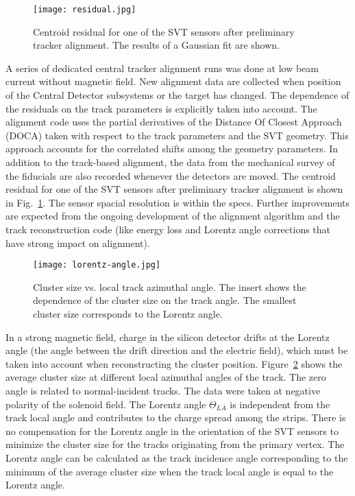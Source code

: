 \begin{figure}[hbt] 
\centering 
\texttt{[image: residual.jpg]}
\caption{Centroid residual for one of the SVT sensors after preliminary tracker alignment. The results of a Gaussian fit are shown.}
\label{fig:residual}
\end{figure}

A series of dedicated central tracker alignment runs was done at low beam current without magnetic field. New alignment data are collected when position of the Central Detector subsystems or the target has changed. The dependence of the residuals on the track parameters is explicitly taken into account. The alignment code uses the partial derivatives of the Distance Of Closest Approach (DOCA) taken with respect to the track parameters and the SVT geometry. This approach accounts for the correlated shifts among the geometry parameters. In addition to the track-based alignment, the data from the mechanical survey of the fiducials are also recorded whenever the detectors are moved. The centroid residual for one of the SVT sensors after preliminary tracker alignment is shown in Fig.~\ref{fig:residual}. The sensor spacial resolution is within the specs. Further improvements are expected from the ongoing development of the alignment algorithm and the track reconstruction code (like energy loss and Lorentz angle corrections that have strong impact on alignment).

\begin{figure}[hbt] 
\centering 
\texttt{[image: lorentz-angle.jpg]}
\caption{Cluster size vs. local track azimuthal angle. The insert shows the dependence of the cluster size on the track angle. The smallest cluster size corresponds to the Lorentz angle.}
\label{fig:lorentz-angle}
\end{figure}

In a strong magnetic field, charge in the silicon detector drifts at the Lorentz angle (the angle between the drift direction and the electric field), which must be taken into account when reconstructing the cluster position. Figure~\ref{fig:lorentz-angle} shows the average cluster size at different local azimuthal angles of the track. The zero angle is related to normal-incident tracks. The data were taken at negative polarity of the solenoid field. The Lorentz angle $\Theta_{LA}$ is independent from the track local angle and contributes to the charge spread among the strips. There is no compensation for the Lorentz angle in the orientation of the SVT sensors to minimize the cluster size for the tracks originating from the primary vertex. The Lorentz angle can be calculated as the track incidence angle corresponding to the minimum of the average cluster size when the track local angle is equal to the Lorentz angle.

